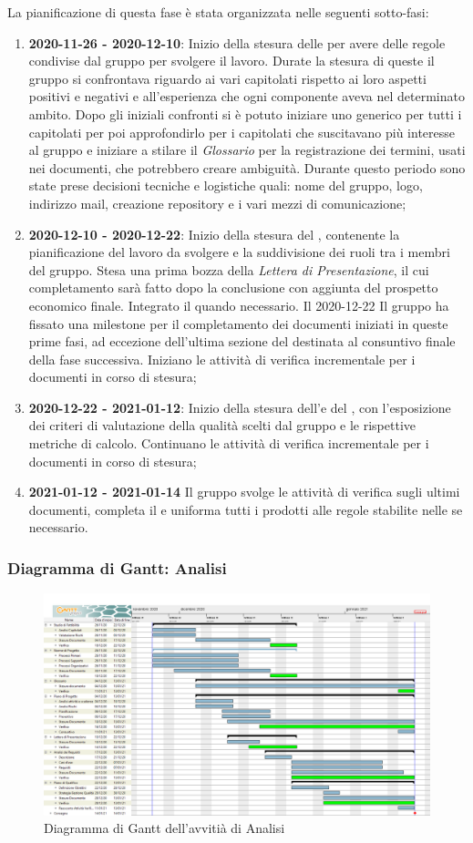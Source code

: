 La pianificazione di questa fase è stata organizzata nelle seguenti sotto-fasi:

\begin{enumerate}
\item \textbf{2020-11-26 - 2020-12-10}:
    Inizio della stesura delle \NdP per avere delle regole condivise dal gruppo per svolgere il lavoro. Durate la stesura di queste il gruppo si confrontava riguardo ai vari capitolati rispetto ai loro aspetti positivi e negativi e all'esperienza che ogni componente aveva nel determinato ambito. Dopo gli iniziali confronti si è potuto iniziare uno \SdF generico per tutti i capitolati per poi approfondirlo per i capitolati che suscitavano più interesse al gruppo e iniziare a stilare il \textit{Glossario} per la registrazione dei termini, usati nei documenti, che potrebbero creare ambiguità. Durante questo periodo sono state prese decisioni tecniche e logistiche quali: nome del gruppo, logo, indirizzo mail, creazione repository e i vari mezzi di comunicazione;
\item \textbf{2020-12-10 - 2020-12-22}:
    Inizio della stesura del \PdP, contenente la pianificazione del lavoro da svolgere e la suddivisione dei ruoli tra i membri del gruppo.
    Stesa una prima bozza della \textit{Lettera di Presentazione}, il cui completamento sarà fatto dopo la conclusione \PdP con aggiunta del prospetto economico finale. Integrato il \Glossario quando necessario.
    Il 2020-12-22 Il gruppo ha fissato una milestone per il completamento dei documenti iniziati in queste prime fasi, ad eccezione dell'ultima sezione del \PdP destinata al consuntivo finale della fase successiva. Iniziano le attività di verifica incrementale per i documenti in corso di stesura;
\item \textbf{2020-12-22 - 2021-01-12}:
    Inizio della stesura dell'\AdR e del \PdQ, con l'esposizione dei criteri di valutazione della qualità scelti dal gruppo e le rispettive metriche di calcolo. Continuano le attività di verifica incrementale per i documenti in corso di stesura;
\item \textbf{2021-01-12 - 2021-01-14}
    Il gruppo svolge le attività di verifica sugli ultimi documenti, completa il \Glossario e uniforma tutti i prodotti alle regole stabilite nelle \NdP se necessario.
\end{enumerate}

\subsubsection{Diagramma di Gantt: Analisi}

\begin{figure}[ht]
    \centering
    \includegraphics[width=\textwidth]{../../Immagini/Analisi}
    \caption{Diagramma di Gantt dell'avvitià di Analisi}
\end{figure}
